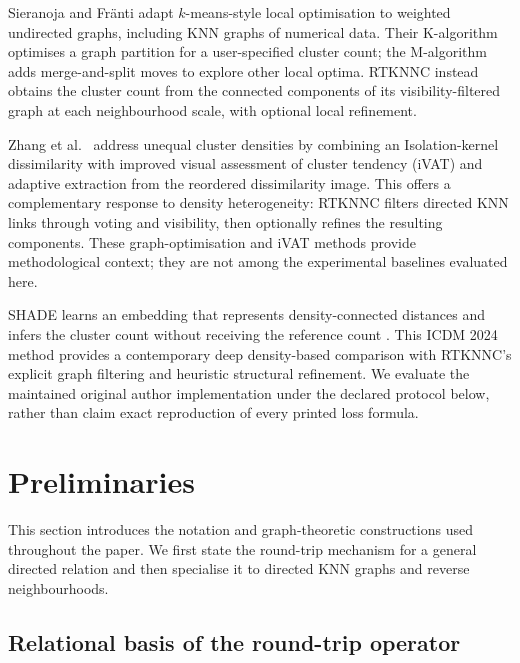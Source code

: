 \documentclass[pdflatex,sn-basic,Numbered]{sn-jnl}
\begin{document}
Sieranoja and Fr\"anti \citep{SieranojaFranti2022Graph} adapt $k$-means-style
local optimisation to weighted undirected graphs, including KNN graphs of
numerical data. Their K-algorithm optimises a graph partition for a
user-specified cluster count; the M-algorithm adds merge-and-split moves to
explore other local optima. RTKNNC instead obtains the cluster count from
the connected components of its visibility-filtered graph at each
neighbourhood scale, with optional local refinement.

Zhang et al.\ \citep{ZhangEtAl2024KernelIVAT} address unequal cluster densities
by combining an Isolation-kernel dissimilarity with improved visual assessment
of cluster tendency (iVAT) and adaptive extraction from the reordered
dissimilarity image. This offers a complementary response to density
heterogeneity: RTKNNC filters directed KNN links through voting and visibility,
then optionally refines the resulting components. These graph-optimisation
and iVAT methods provide methodological context; they are not among the
experimental baselines evaluated here.

SHADE learns an embedding that represents density-connected distances and
infers the cluster count without receiving the reference count
\citep{BeerEtAl2024SHADE}. This ICDM 2024 method provides a contemporary deep
density-based comparison with RTKNNC's explicit graph filtering and heuristic
structural refinement. We evaluate the maintained original author
implementation under the declared protocol below, rather than claim exact
reproduction of every printed loss formula.

\section{Preliminaries}\label{sec:preliminaries}

This section introduces the notation and graph-theoretic constructions used throughout the paper. We first state the round-trip mechanism for a general directed relation and then specialise it to directed KNN graphs and reverse neighbourhoods.

\subsection{Relational basis of the round-trip operator}\label{sec:relational_origin}
\end{document}
